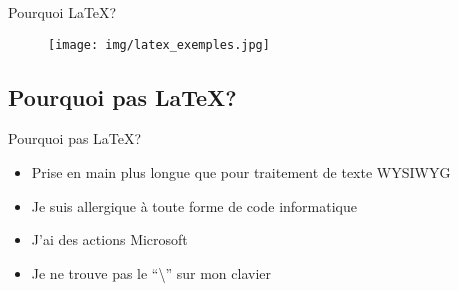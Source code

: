 \begin{frame}{Pourquoi \LaTeX{}?}
\begin{figure}[htbp]
\begin{center}
\texttt{[image: img/latex\_exemples.jpg]}
\end{center}
\end{figure}
\end{frame}

\subsection{Pourquoi pas \LaTeX{}?}

\begin{frame}{Pourquoi pas \LaTeX{}?}
  \begin{itemize}
    \item Prise en main plus longue que pour traitement de texte WYSIWYG
    \item Je suis allergique à toute forme de code informatique
    \item J'ai des actions Microsoft
    \item Je ne trouve pas le ``\textbackslash'' sur mon clavier
  \end{itemize}
\end{frame}

\begin{comment}
\begin{frame}{Oui mais\ldots{}}
  \begin{center}
    \begin{tikzpicture}
      \begin{axis}[xmin=0, xmax=4, ymin=-2, ymax=5, ticks=none,
          xlabel={Expérience}, ylabel=Productivité,
        legend style={at={(0.01,0.99)}, anchor=north west}]
        \addplot[smooth, color=blue]{x-0.05};
        \addlegendentry{\LaTeX}
        \addplot[smooth, color=red,domain=0:5]{sqrt(x)};
        \addlegendentry{Word}
      \end{axis}
      \foreach \x/\com/\deltax/\deltay/\adj in {
        {1.1}/{\scriptsize Maintenant}/{0}/{0.8}/below,
        {2.2}/{\scriptsize Après la formation}/{0}/{0.4}/below,
        {4.6}/{\scriptsize Au bout de quelques semaines}/{0}/{1.2}/below
      } {
        \draw[dashed] (\x,0) -- (\x+\deltax,\deltay) node[above] {\com};
      }
    \end{tikzpicture}
  \end{center}
\end{frame}
\end{comment}

